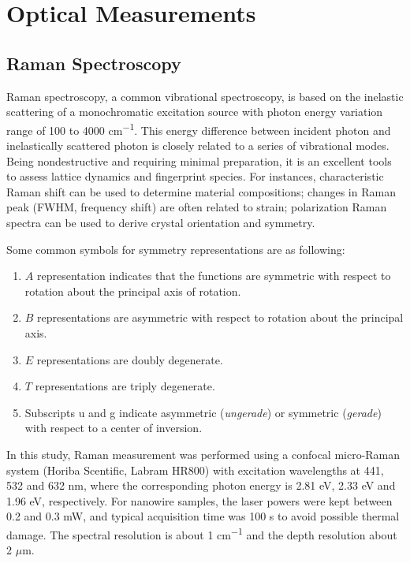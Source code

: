 \section{Optical Measurements}
\subsection{Raman Spectroscopy}

Raman spectroscopy, a common vibrational spectroscopy, is based on the inelastic scattering of a monochromatic excitation source with photon energy variation range of 100 to 4000 \si{cm^{-1}}. This energy difference between incident photon and inelastically scattered photon is closely related to a series of vibrational modes. Being nondestructive and requiring minimal preparation, it is an excellent tools to assess lattice dynamics and fingerprint species.\cite{McCreery2000} For instances, characteristic Raman shift can be used to determine material compositions; changes in Raman peak (FWHM, frequency shift) are often related to strain; polarization Raman spectra can be used to derive crystal orientation and symmetry. 

Some common symbols for symmetry representations are as following:
\begin{enumerate}
\item $A$ representation indicates that the functions are symmetric with respect to rotation about the principal axis of rotation.
\item $B$ representations are asymmetric with respect to rotation about the principal axis.
\item $E$ representations are doubly degenerate.
\item $T$ representations are triply degenerate.
\item Subscripts u and g indicate asymmetric (\emph{ungerade}) or symmetric (\emph{gerade}) with respect to a center of inversion.
\end{enumerate}

In this study, Raman measurement was performed using a confocal micro-Raman system (Horiba Scentific, Labram HR800) with excitation wavelengths at 441, 532 and 632 nm, where the corresponding photon energy is 2.81 eV, 2.33 eV and 1.96 eV, respectively. For nanowire samples, the laser powers were kept between 0.2 and 0.3 mW, and typical acquisition time was 100 s to avoid possible thermal damage. The spectral resolution is about 1 \si{cm^{-1}} and the depth resolution about 2 $\mu$m.

